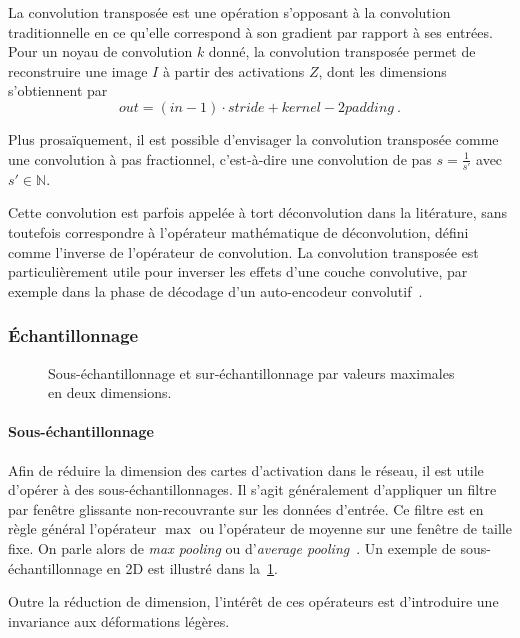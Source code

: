 La convolution transposée est une opération s'opposant à la convolution traditionnelle en ce qu'elle correspond à son gradient par rapport à ses entrées. Pour un noyau de convolution $k$ donné, la convolution transposée permet de reconstruire une image $I$ à partir des activations $Z$, dont les dimensions s'obtiennent par
$$out = (in - 1) \cdot stride + kernel - 2padding~.$$

Plus prosaïquement, il est possible d'envisager la convolution transposée comme une convolution à pas fractionnel, c'est-à-dire une convolution de pas $s = \frac{1}{s'}$ avec $s' \in \mathbb{N}$.

Cette convolution est parfois appelée à tort \og déconvolution \fg dans la litérature, sans toutefois correspondre à l'opérateur mathématique de déconvolution, défini comme l'inverse de l'opérateur de convolution. La convolution transposée est particulièrement utile pour inverser les effets d'une couche convolutive, par exemple dans la phase de décodage d'un auto-encodeur convolutif~\cite{zhao_stacked_2015-1}.

\subsubsection{Échantillonnage}

\begin{figure}
  \resizebox{\textwidth}{!}{
  
  }
  \caption{Sous-échantillonnage et sur-échantillonnage par valeurs maximales en deux dimensions.}
  \label{fig:pooling}
\end{figure}

\paragraph{Sous-échantillonnage}

Afin de réduire la dimension des cartes d'activation dans le réseau, il est utile d'opérer à des sous-échantillonnages. Il s'agit généralement d'appliquer un filtre par fenêtre glissante non-recouvrante sur les données d'entrée. Ce filtre est en règle général l'opérateur $\max$ ou l'opérateur de moyenne sur une fenêtre de taille fixe. On parle alors de \emph{max pooling} ou d'\emph{average pooling}~\cite{zhou_stereo_1988}. Un exemple de sous-échantillonnage en 2D est illustré dans la~\cref{fig:pooling}.

Outre la réduction de dimension, l'intérêt de ces opérateurs est d'introduire une invariance aux déformations légères.

